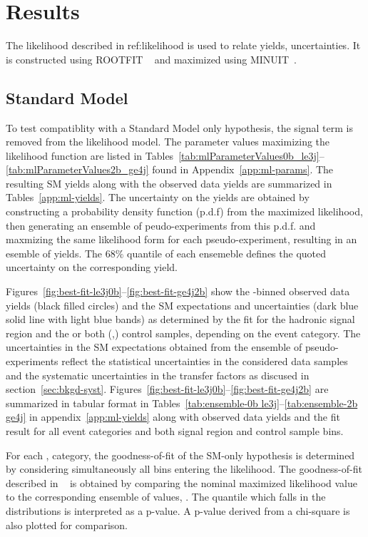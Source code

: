 \clearpage
\section{Results\label{sec:results}}

The likelihood described in ref:likelihood is used to
relate yields, uncertainties. It is constructed using ROOTFIT
~\cite{roofit} and maximized using MINUIT~\cite{James:1975dr}.

\subsection{Standard Model\label{sec:smInterp}}

To test compatiblity with a Standard Model only hypothesis,
the signal term is removed from the likelihood model. The parameter values 
maximizing the likelihood function are listed in 
Tables~\ref{tab:mlParameterValues0b_le3j}--\ref{tab:mlParameterValues2b_ge4j}
found in Appendix~\ref{app:ml-params}. The resulting SM yields
along with the observed data yields are summarized in Tables~\ref{app:ml-yields}. 
The uncertainty on the yields are obtained by constructing a probability density
function (p.d.f) from the maximized likelihood, then generating an
ensemble of peudo-experiments from this p.d.f. and maxmizing the same 
likelihood form for each pseudo-experiment, resulting in an esemble of yields.
The $68\%$ quantile of each ensemeble defines the quoted uncertainty on the 
corresponding yield.

Figures~\ref{fig:best-fit-le3j0b}--\ref{fig:best-fit-ge4j2b} show
the \scalht-binned observed data yields (black filled circles) and the
SM expectations and uncertainties (dark blue solid line with light
blue bands) as determined by the fit for the hadronic signal region
and the \mj or both (\mj,\gj) control samples, depending on the event
category. The uncertainties in the SM expectations obtained from the 
ensemble of pseudo-experiments reflect the statistical uncertainties in
the considered data samples and the systematic uncertainties
in the transfer factors as discused in section~\ref{sec:bkgd-syst}.
Figures~\ref{fig:best-fit-le3j0b}--\ref{fig:best-fit-ge4j2b} are summarized
in tabular format in Tables~\ref{tab:ensemble-0b le3j}--\ref{tab:ensemble-2b ge4j} 
in appendix~\ref{app:ml-yields} along with observed data yields and the fit 
result for all event categories and both signal region and control sample bins.

For each \nb, \njet category, the goodness-of-fit of the SM-only hypothesis 
is determined by considering simultaneously all \scalht bins entering
the likelihood. The goodness-of-fit described in ~\cite{Cowan:358560} is obtained
by comparing the nominal maximized likelihood value  to 
the corresponding ensemble of values, . The quantile which 
falls in the distributions is interpreted as a p-value.  A p-value derived from
a chi-square is also plotted for comparison. 

